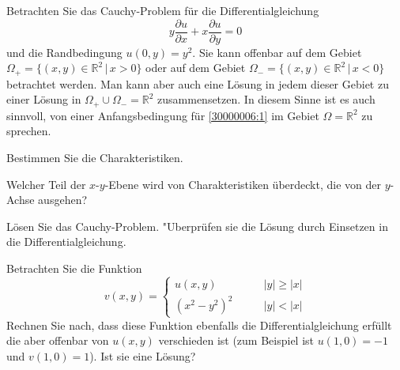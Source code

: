 Betrachten Sie das Cauchy-Problem für die Differentialgleichung
\begin{equation}
y\frac{\partial u}{\partial x}+x\frac{\partial u}{\partial y}=0
\label{30000006:1}
\end{equation}
und die Randbedingung $u(0,y)=y^2$.
Sie kann offenbar auf dem Gebiet $\Omega_+=\{ (x,y)\in\mathbb R^2\,|\, x > 0\}$
oder auf dem Gebiet $\Omega_-=\{(x,y)\in\mathbb R^2\,|\, x <0\}$ betrachtet
werden. Man kann aber auch eine Lösung in jedem dieser Gebiet zu einer
Lösung in $\Omega_+\cup\Omega_-=\mathbb R^2$ zusammensetzen. In diesem
Sinne ist es auch sinnvoll, von einer Anfangsbedingung für
\eqref{30000006:1} im Gebiet $\Omega=\mathbb R^2$ zu sprechen.
\begin{teilaufgaben}
\item Bestimmen Sie die Charakteristiken.
\item Welcher Teil der $x$-$y$-Ebene wird von Charakteristiken überdeckt,
die von der $y$-Achse ausgehen?
\item Lösen Sie das Cauchy-Problem. "Uberprüfen sie die Lösung durch
Einsetzen in die Differentialgleichung.
\item Betrachten Sie die Funktion
\[
v(x,y)=\begin{cases}
u(x,y)&\qquad |y|\ge |x|\\
(x^2-y^2)^2&\qquad |y|<|x|
\end{cases}
\]
Rechnen Sie nach, dass diese Funktion ebenfalls die Differentialgleichung
erfüllt
die aber offenbar von $u(x,y)$ verschieden ist (zum Beispiel ist
$u(1,0)=-1$ und $v(1,0)=1$). Ist sie eine Lösung?
\end{teilaufgaben}

